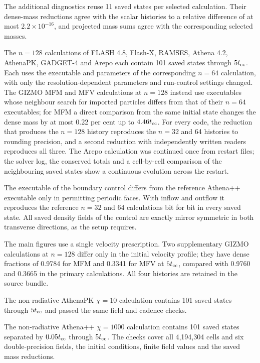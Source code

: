 \documentclass[twocolumn,apj,numberedappendix]{openjournal}
\begin{document}
The additional diagnostics reuse 11 saved states per selected calculation. Their dense-mass reductions agree with the scalar histories to a relative difference of at most $2.2\times10^{-16}$, and projected mass sums agree with the corresponding selected masses.

The $n=128$ calculations of FLASH 4.8, Flash-X, RAMSES, Athena 4.2, AthenaPK, GADGET-4 and Arepo each contain 101 saved states through $5t_{\rm cc}$. Each uses the executable and parameters of the corresponding $n=64$ calculation, with only the resolution-dependent parameters and run-control settings changed. The GIZMO MFM and MFV calculations at $n=128$ instead use executables whose neighbour search for imported particles differs from that of their $n=64$ executables; for MFM a direct comparison from the same initial state changes the dense mass by at most 0.22 per cent up to $4.46t_{\rm cc}$. For every code, the reduction that produces the $n=128$ history reproduces the $n=32$ and 64 histories to rounding precision, and a second reduction with independently written readers reproduces all three. The Arepo calculation was continued once from restart files; the solver log, the conserved totals and a cell-by-cell comparison of the neighbouring saved states show a continuous evolution across the restart.

The executable of the boundary control differs from the reference Athena++ executable only in permitting periodic faces. With inflow and outflow it reproduces the reference $n=32$ and 64 calculations bit for bit in every saved state. All saved density fields of the control are exactly mirror symmetric in both transverse directions, as the setup requires.

The main figures use a single velocity prescription. Two supplementary GIZMO calculations at $n=128$ differ only in the initial velocity profile; they have dense fractions of 0.9784 for MFM and 0.3341 for MFV at $5t_{\rm cc}$, compared with 0.9760 and 0.3665 in the primary calculations. All four histories are retained in the source bundle.

The non-radiative AthenaPK $\chi=10$ calculation contains 101 saved states through $5t_{\rm cc}$ and passed the same field and cadence checks.

The non-radiative Athena++ $\chi=1000$ calculation contains 101 saved states separated by $0.05t_{\rm cc}$ through $5t_{\rm cc}$. The checks cover all 4,194,304 cells and six double-precision fields, the initial conditions, finite field values and the saved mass reductions.
\end{document}
